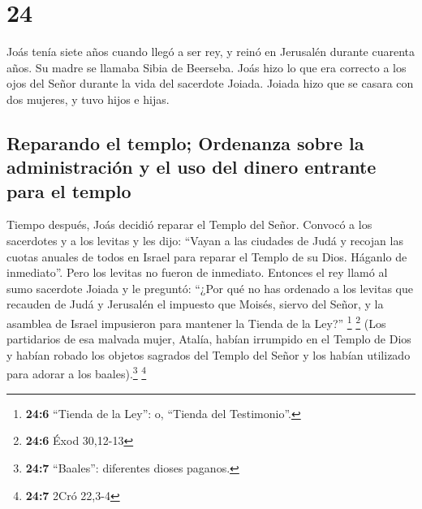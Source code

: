 \hypertarget{section-23}{%
\section{24}\label{section-23}}

 Joás tenía siete años cuando llegó a ser rey, y reinó en
Jerusalén durante cuarenta años. Su madre se llamaba Sibia de Beerseba.
 Joás hizo lo que era correcto a los ojos del Señor
durante la vida del sacerdote Joiada.  Joiada hizo que se
casara con dos mujeres, y tuvo hijos e hijas.

\hypertarget{reparando-el-templo-ordenanza-sobre-la-administraciuxf3n-y-el-uso-del-dinero-entrante-para-el-templo}{%
\subsection{Reparando el templo; Ordenanza sobre la administración y el
uso del dinero entrante para el
templo}\label{reparando-el-templo-ordenanza-sobre-la-administraciuxf3n-y-el-uso-del-dinero-entrante-para-el-templo}}

 Tiempo después, Joás decidió reparar el Templo del Señor.
 Convocó a los sacerdotes y a los levitas y les dijo:
``Vayan a las ciudades de Judá y recojan las cuotas anuales de todos en
Israel para reparar el Templo de su Dios. Háganlo de inmediato''. Pero
los levitas no fueron de inmediato.  Entonces el rey llamó
al sumo sacerdote Joiada y le preguntó: ``¿Por qué no has ordenado a los
levitas que recauden de Judá y Jerusalén el impuesto que Moisés, siervo
del Señor, y la asamblea de Israel impusieron para mantener la Tienda de
la Ley?'' \footnote{\textbf{24:6} ``Tienda de la Ley'': o, ``Tienda del
  Testimonio''.} \footnote{\textbf{24:6} Éxod 30,12-13} 
(Los partidarios de esa malvada mujer, Atalía, habían irrumpido en el
Templo de Dios y habían robado los objetos sagrados del Templo del Señor
y los habían utilizado para adorar a los baales).\footnote{\textbf{24:7}
  ``Baales'': diferentes dioses paganos.} \footnote{\textbf{24:7} 2Cró
  22,3-4}

